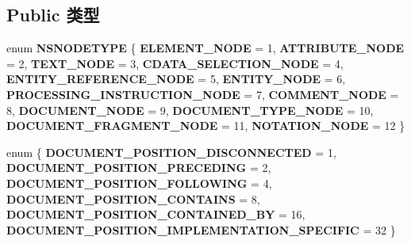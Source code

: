\subsection*{Public 类型}
\begin{DoxyCompactItemize}
\item 
\mbox{\label{interfacens_i_d_o_m_node_a28e8cc06006dcbdc149b5105a0928568}} 
enum {\bfseries N\+S\+N\+O\+D\+E\+T\+Y\+PE} \{ \newline
{\bfseries E\+L\+E\+M\+E\+N\+T\+\_\+\+N\+O\+DE} = 1, 
{\bfseries A\+T\+T\+R\+I\+B\+U\+T\+E\+\_\+\+N\+O\+DE} = 2, 
{\bfseries T\+E\+X\+T\+\_\+\+N\+O\+DE} = 3, 
{\bfseries C\+D\+A\+T\+A\+\_\+\+S\+E\+L\+E\+C\+T\+I\+O\+N\+\_\+\+N\+O\+DE} = 4, 
\newline
{\bfseries E\+N\+T\+I\+T\+Y\+\_\+\+R\+E\+F\+E\+R\+E\+N\+C\+E\+\_\+\+N\+O\+DE} = 5, 
{\bfseries E\+N\+T\+I\+T\+Y\+\_\+\+N\+O\+DE} = 6, 
{\bfseries P\+R\+O\+C\+E\+S\+S\+I\+N\+G\+\_\+\+I\+N\+S\+T\+R\+U\+C\+T\+I\+O\+N\+\_\+\+N\+O\+DE} = 7, 
{\bfseries C\+O\+M\+M\+E\+N\+T\+\_\+\+N\+O\+DE} = 8, 
\newline
{\bfseries D\+O\+C\+U\+M\+E\+N\+T\+\_\+\+N\+O\+DE} = 9, 
{\bfseries D\+O\+C\+U\+M\+E\+N\+T\+\_\+\+T\+Y\+P\+E\+\_\+\+N\+O\+DE} = 10, 
{\bfseries D\+O\+C\+U\+M\+E\+N\+T\+\_\+\+F\+R\+A\+G\+M\+E\+N\+T\+\_\+\+N\+O\+DE} = 11, 
{\bfseries N\+O\+T\+A\+T\+I\+O\+N\+\_\+\+N\+O\+DE} = 12
 \}
\item 
\mbox{\label{interfacens_i_d_o_m_node_a680e350122b38da9c5db357f54edd2ed}} 
enum \{ \newline
{\bfseries D\+O\+C\+U\+M\+E\+N\+T\+\_\+\+P\+O\+S\+I\+T\+I\+O\+N\+\_\+\+D\+I\+S\+C\+O\+N\+N\+E\+C\+T\+ED} = 1, 
{\bfseries D\+O\+C\+U\+M\+E\+N\+T\+\_\+\+P\+O\+S\+I\+T\+I\+O\+N\+\_\+\+P\+R\+E\+C\+E\+D\+I\+NG} = 2, 
{\bfseries D\+O\+C\+U\+M\+E\+N\+T\+\_\+\+P\+O\+S\+I\+T\+I\+O\+N\+\_\+\+F\+O\+L\+L\+O\+W\+I\+NG} = 4, 
{\bfseries D\+O\+C\+U\+M\+E\+N\+T\+\_\+\+P\+O\+S\+I\+T\+I\+O\+N\+\_\+\+C\+O\+N\+T\+A\+I\+NS} = 8, 
\newline
{\bfseries D\+O\+C\+U\+M\+E\+N\+T\+\_\+\+P\+O\+S\+I\+T\+I\+O\+N\+\_\+\+C\+O\+N\+T\+A\+I\+N\+E\+D\+\_\+\+BY} = 16, 
{\bfseries D\+O\+C\+U\+M\+E\+N\+T\+\_\+\+P\+O\+S\+I\+T\+I\+O\+N\+\_\+\+I\+M\+P\+L\+E\+M\+E\+N\+T\+A\+T\+I\+O\+N\+\_\+\+S\+P\+E\+C\+I\+F\+IC} = 32
 \}
\end{DoxyCompactItemize}
